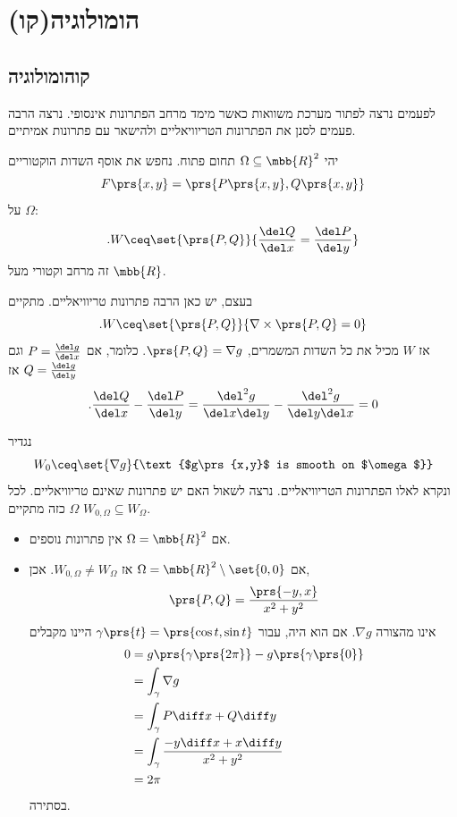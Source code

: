 \documentclass[a4paper,10pt,twoside,openany]{book}
\begin{document}
\section{(קו)הומולוגיה}

\subsection{קוהומולוגיה}

לפעמים נרצה לפתור מערכת משוואות כאשר מימד מרחב הפתרונות אינסופי. נרצה הרבה פעמים לסנן את הפתרונות הטריוויאליים ולהישאר עם פתרונות אמיתיים.

\begin{example}
יהי
$\Omega \subseteq \mbb{R}^2$
תחום פתוח.
נחפש את אוסף השדות הוקטוריים
\[F\prs{x,y} = \prs{P\prs{x,y}, Q\prs{x,y}}\]
על
$\Omega$:
\[\text{.} W \ceq \set{\prs{P,Q}}{\frac{\del Q}{\del x} = \frac{\del P}{\del y}}\]
זה מרחב וקטורי מעל
$\mbb{R}$.

בעצם, יש כאן הרבה פתרונות טריוויאליים. מתקיים
\[\text{.} W \ceq \set{\prs{P,Q}}{\nabla \times \prs{P,Q} = 0}\]
אז
$W$
מכיל את כל השדות המשמרים,
$\prs{P,Q} = \nabla g$.
כלומר, אם
$P = \frac{\del g}{\del x}$
וגם
$Q = \frac{\del g}{\del y}$
אז
\[\text{.} \frac{\del Q}{\del x} - \frac{\del P}{\del y} = \frac{\del^2 g}{\del x \del y} - \frac{\del^2 g}{\del y \del x} = 0\]

נגדיר
\[W_0 \ceq \set{\nabla g}{\text{$g\prs{x,y}$ is smooth on $\omega$}}\]
ונקרא לאלו הפתרונות הטריוויאליים. נרצה לשאול האם יש פתרונות שאינם טריוויאליים.
לכל
$\Omega$
כזה מתקיים
$W_{0,\Omega} \subseteq W_\Omega$.

\begin{itemize}
\item אם
$\Omega = \mbb{R}^2$
אין פתרונות נוספים.

\item אם
$\Omega = \mbb{R}^2 \setminus \set{0,0}$
אז
$W_{0,\Omega} \neq W_{\Omega}$.
אכן,
\[\prs{P,Q} = \frac{\prs{-y,x}}{x^2 + y^2}\]
אינו מהצורה
$\nabla g$.
אם הוא היה, עבור
$\gamma\prs{t} = \prs{\cos t, \sin t}$
היינו מקבלים
\begin{align*}
0 &= g\prs{\gamma\prs{2 \pi}} - g\prs{\gamma\prs{0}}
\\&=
\int_\gamma \nabla g
\\&=
\int_\gamma P \diff x + Q \diff y
\\&=
\int_\gamma \frac{-y \diff x + x \diff y}{x^2 + y^2}
\\&= 2 \pi
\end{align*}
בסתירה.
\end{itemize}
\end{example}
\end{document}
